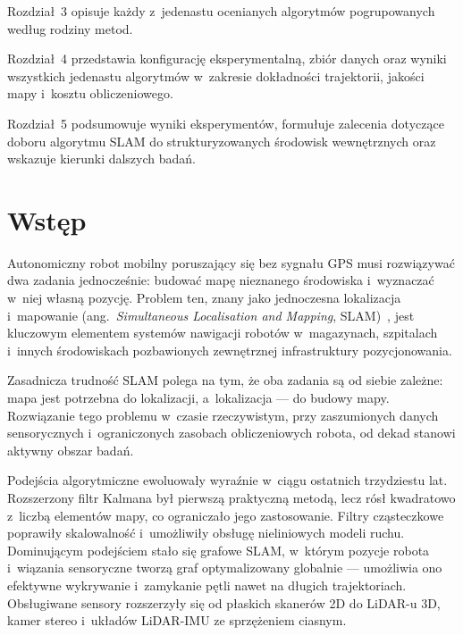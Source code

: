Rozdział~3 opisuje każdy z~jedenastu ocenianych algorytmów pogrupowanych
według rodziny metod.

Rozdział~4 przedstawia konfigurację eksperymentalną, zbiór danych oraz wyniki
wszystkich jedenastu algorytmów w~zakresie dokładności trajektorii, jakości
mapy i~kosztu obliczeniowego.

Rozdział~5 podsumowuje wyniki eksperymentów, formułuje zalecenia dotyczące
doboru algorytmu SLAM do strukturyzowanych środowisk wewnętrznych oraz wskazuje
kierunki dalszych badań.

\endgroup



\chapter{Wstęp}

Autonomiczny robot mobilny poruszający się bez sygnału GPS musi rozwiązywać dwa
zadania jednocześnie: budować mapę nieznanego środowiska i~wyznaczać w~niej
własną pozycję.
Problem ten, znany jako jednoczesna lokalizacja i~mapowanie
(ang.~\textit{Simultaneous Localisation and Mapping},
SLAM)~\cite{leonard1991mobile}, jest kluczowym elementem systemów nawigacji
robotów w~magazynach, szpitalach i~innych środowiskach pozbawionych
zewnętrznej infrastruktury pozycjonowania.

Zasadnicza trudność SLAM polega na tym, że oba zadania są od siebie zależne:
mapa jest potrzebna do lokalizacji, a~lokalizacja --- do budowy mapy.
Rozwiązanie tego problemu w~czasie rzeczywistym, przy zaszumionych danych
sensorycznych i~ograniczonych zasobach obliczeniowych robota,
od dekad stanowi aktywny obszar badań.

Podejścia algorytmiczne ewoluowały wyraźnie w~ciągu ostatnich trzydziestu lat.
Rozszerzony filtr Kalmana był pierwszą praktyczną metodą, lecz rósł kwadratowo
z~liczbą elementów mapy, co ograniczało jego zastosowanie.
Filtry cząsteczkowe poprawiły skalowalność i~umożliwiły obsługę nieliniowych
modeli ruchu.
Dominującym podejściem stało się grafowe SLAM, w~którym pozycje robota
i~wiązania sensoryczne tworzą graf optymalizowany globalnie --- umożliwia ono
efektywne wykrywanie i~zamykanie pętli nawet na długich trajektoriach.
Obsługiwane sensory rozszerzyły się od płaskich skanerów 2D do LiDAR-u 3D,
kamer stereo i~układów LiDAR-IMU ze sprzężeniem ciasnym.

